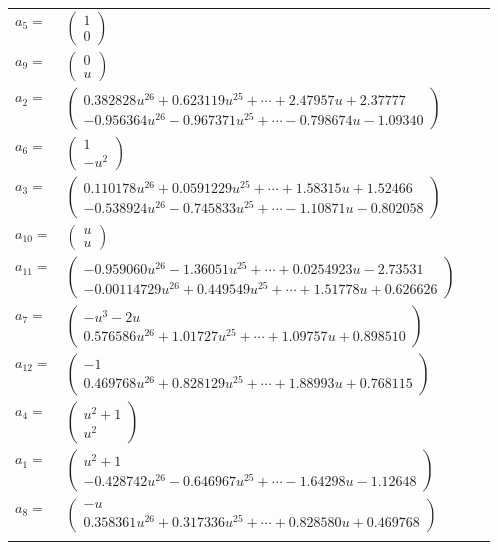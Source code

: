 \documentclass[1p]{elsarticle_modified}
\theoremstyle{definition}
\begin{document}
\begin{tabular}{m{7pt} m{180pt} m{7pt} m{180pt} }
\flushright $a_{5}=$&$\begin{pmatrix}1\\0\end{pmatrix}$ \\
\flushright $a_{9}=$&$\begin{pmatrix}0\\u\end{pmatrix}$ \\
\flushright $a_{2}=$&$\begin{pmatrix}0.382828 u^{26}+0.623119 u^{25}+\cdots+2.47957 u+2.37777\\-0.956364 u^{26}-0.967371 u^{25}+\cdots-0.798674 u-1.09340\end{pmatrix}$ \\
\flushright $a_{6}=$&$\begin{pmatrix}1\\- u^2\end{pmatrix}$ \\
\flushright $a_{3}=$&$\begin{pmatrix}0.110178 u^{26}+0.0591229 u^{25}+\cdots+1.58315 u+1.52466\\-0.538924 u^{26}-0.745833 u^{25}+\cdots-1.10871 u-0.802058\end{pmatrix}$ \\
\flushright $a_{10}=$&$\begin{pmatrix}u\\u\end{pmatrix}$ \\
\flushright $a_{11}=$&$\begin{pmatrix}-0.959060 u^{26}-1.36051 u^{25}+\cdots+0.0254923 u-2.73531\\-0.00114729 u^{26}+0.449549 u^{25}+\cdots+1.51778 u+0.626626\end{pmatrix}$ \\
\flushright $a_{7}=$&$\begin{pmatrix}- u^3-2 u\\0.576586 u^{26}+1.01727 u^{25}+\cdots+1.09757 u+0.898510\end{pmatrix}$ \\
\flushright $a_{12}=$&$\begin{pmatrix}-1\\0.469768 u^{26}+0.828129 u^{25}+\cdots+1.88993 u+0.768115\end{pmatrix}$ \\
\flushright $a_{4}=$&$\begin{pmatrix}u^2+1\\u^2\end{pmatrix}$ \\
\flushright $a_{1}=$&$\begin{pmatrix}u^2+1\\-0.428742 u^{26}-0.646967 u^{25}+\cdots-1.64298 u-1.12648\end{pmatrix}$ \\
\flushright $a_{8}=$&$\begin{pmatrix}- u\\0.358361 u^{26}+0.317336 u^{25}+\cdots+0.828580 u+0.469768\end{pmatrix}$\\&\end{tabular}
\end{document}
